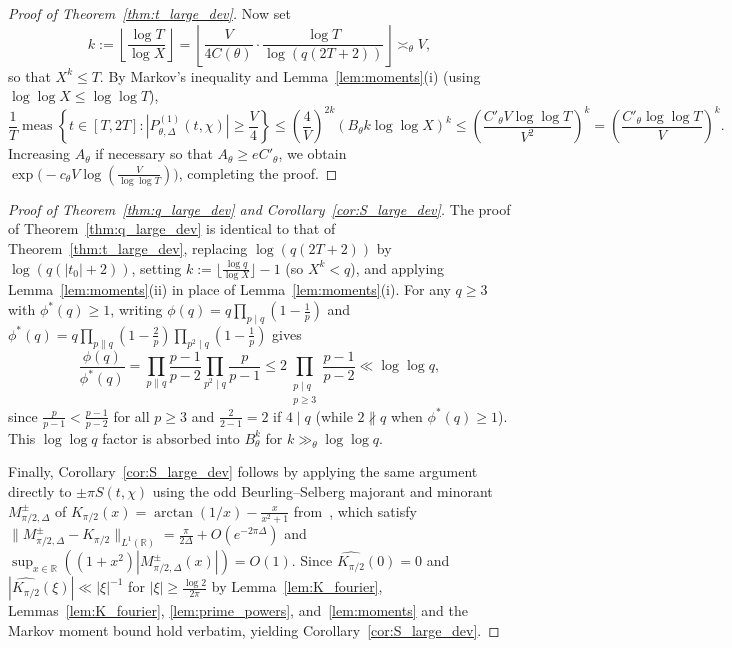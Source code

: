 \documentclass[11pt,a4paper]{amsart}
\theoremstyle{remark}
\numberwithin{equation}{section}
\newcommand{\R}{\mathbb{R}}
\DeclareMathOperator{\meas}{meas}
\begin{document}
\begin{proof}[Proof of Theorem~\ref{thm:t_large_dev}]
Now set
\[
  k := \left\lfloor\frac{\log T}{\log X}\right\rfloor = \left\lfloor\frac{V}{4C(\theta)}\cdot\frac{\log T}{\log(q(2T+2))}\right\rfloor \asymp_\theta V,
\]
so that $X^k \le T$. By Markov's inequality and Lemma~\ref{lem:moments}(i) (using $\log\log X \le \log\log T$),
\[
  \frac{1}{T}\meas\left\{t \in [T,2T] : |P_{\theta,\Delta}^{(1)}(t,\chi)| \ge \frac{V}{4}\right\}
  \le \left(\frac{4}{V}\right)^{2k}(B_\theta k\log\log X)^k
  \le \left(\frac{C'_\theta V\log\log T}{V^2}\right)^k
  = \left(\frac{C'_\theta\log\log T}{V}\right)^k.
\]
Increasing $A_\theta$ if necessary so that $A_\theta \ge e C'_\theta$, we obtain $\exp\bigl(-c_\theta V\log(\frac{V}{\log\log T})\bigr)$, completing the proof.
\end{proof}

\begin{proof}[Proof of Theorem~\ref{thm:q_large_dev} and Corollary~\ref{cor:S_large_dev}]
The proof of Theorem~\ref{thm:q_large_dev} is identical to that of Theorem~\ref{thm:t_large_dev}, replacing $\log(q(2T+2))$ by $\log(q(|t_0|+2))$, setting $k := \lfloor\frac{\log q}{\log X}\rfloor - 1$ (so $X^k < q$), and applying Lemma~\ref{lem:moments}(ii) in place of Lemma~\ref{lem:moments}(i). For any $q \ge 3$ with $\phi^*(q) \ge 1$, writing $\phi(q) = q\prod_{p\mid q}(1-\frac{1}{p})$ and $\phi^*(q) = q\prod_{p\parallel q}(1-\frac{2}{p})\prod_{p^2\mid q}(1-\frac{1}{p})$ gives
\[
  \frac{\phi(q)}{\phi^*(q)} = \prod_{p\parallel q}\frac{p-1}{p-2}\prod_{p^2\mid q}\frac{p}{p-1} \le 2\prod_{\substack{p\mid q\\ p\ge 3}}\frac{p-1}{p-2} \ll \log\log q,
\]
since $\frac{p}{p-1} < \frac{p-1}{p-2}$ for all $p \ge 3$ and $\frac{2}{2-1} = 2$ if $4 \mid q$ (while $2 \nparallel q$ when $\phi^*(q) \ge 1$). This $\log\log q$ factor is absorbed into $B_\theta^k$ for $k \gg_\theta \log\log q$.

Finally, Corollary~\ref{cor:S_large_dev} follows by applying the same argument directly to $\pm\pi S(t,\chi)$ using the odd Beurling--Selberg majorant and minorant $M_{\pi/2,\Delta}^\pm$ of $K_{\pi/2}(x) = \arctan(1/x) - \frac{x}{x^2+1}$ from~\cite{CCM2013}, which satisfy $\|M_{\pi/2,\Delta}^\pm - K_{\pi/2}\|_{L^1(\R)} = \frac{\pi}{2\Delta} + O(e^{-2\pi\Delta})$ and $\sup_{x\in\R}((1+x^2)|M_{\pi/2,\Delta}^\pm(x)|) = O(1)$. Since $\widehat{K_{\pi/2}}(0) = 0$ and $|\widehat{K_{\pi/2}}(\xi)| \ll |\xi|^{-1}$ for $|\xi| \ge \frac{\log 2}{2\pi}$ by Lemma~\ref{lem:K_fourier}, Lemmas~\ref{lem:K_fourier}, \ref{lem:prime_powers}, and~\ref{lem:moments} and the Markov moment bound hold verbatim, yielding Corollary~\ref{cor:S_large_dev}.
\end{proof}
\end{document}
